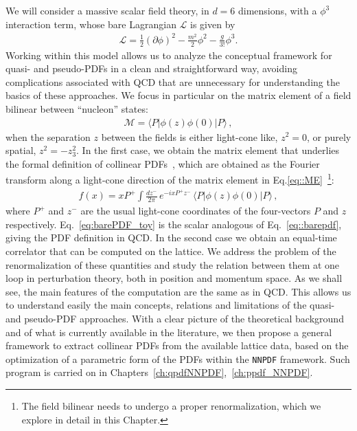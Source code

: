 We will consider a massive scalar field theory, in $d=6$ dimensions, with a
$\phi^3$ interaction term, whose bare Lagrangian $\mathcal{L}$ is given by
\begin{align}
    \label{eq:Lagrangian}
    \mathcal{L} = \frac{1}{2}\left(\partial\phi\right)^2 
    - \frac{m^2}{2} \phi^2 - \frac{g}{3!} \phi^3.
\end{align}
Working within this model allows us to analyze the conceptual framework for
quasi- and pseudo-PDFs in a clean and straightforward way, avoiding
complications associated with QCD that are unnecessary for understanding the
basics of these approaches. We focus in particular on the matrix element of a
field bilinear between ``nucleon'' states: 
\begin{align}
    \label{eq::ME}
    \mathcal{M} = 
    \langle P | \phi\left(z\right) \phi\left(0\right) | P \rangle\, ,
\end{align}
when the separation $z$ between the fields is either light-cone like, $z^2=0$,
or purely spatial, $z^2=-z_3^2$. In the first case, we obtain the matrix element
that underlies the formal definition of collinear PDFs~\cite{Collins:1980ui,
Collins:1981uw}, which are obtained as the Fourier transform along a light-cone
direction of the matrix element in Eq.\eqref{eq::ME}~\footnote{The field
bilinear needs to undergo a proper renormalization, which we explore in detail in
this Chapter. }:
\begin{align}
    \label{eq:barePDF_toy}
    f(x) = xP^+ \int \frac{dz^-}{2\pi}\, e^{-i xP^+ z^-}\,
    \langle P | \phi\left(z\right) \phi\left(0\right) | P \rangle\, ,
\end{align}
where $P^+$ and $z^-$ are the usual light-cone coordinates of the four-vectors
$P$ and $z$ respectively.
Eq.~\eqref{eq:barePDF_toy} is the scalar analogous of Eq.~\eqref{eq::barepdf}, giving the PDF definition in QCD.
In the second case we obtain an equal-time correlator
that can be computed on the lattice. We address the problem of the
renormalization of these quantities and study the relation between them at one
loop in perturbation theory, both in position and momentum space. As we shall
see, the main features of the computation are the same as in QCD. This allows us
to understand easily the main concepts, relations and limitations of the quasi-
and pseudo-PDF approaches. With a clear picture of the theoretical background
and of what is currently available in the literature, we then propose a general
framework to extract collinear PDFs from the available lattice data, based on
the optimization of a parametric form of the PDFs within the {\tt NNPDF} framework.
Such program is carried on in Chapters~\ref{ch:qpdfNNPDF},~\ref{ch:ppdf_NNPDF}.

